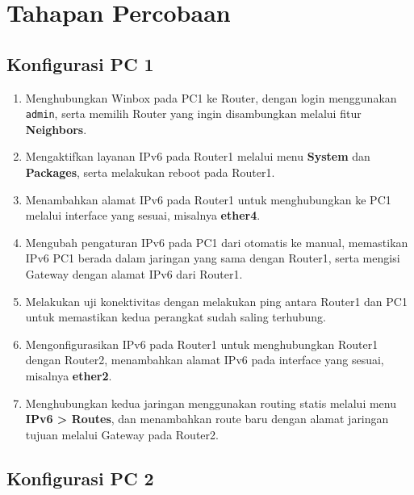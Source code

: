 \section*{Tahapan Percobaan} 

\subsection*{Konfigurasi PC 1}

\begin{enumerate}
    \item Menghubungkan Winbox pada PC1 ke Router, dengan login menggunakan \texttt{admin}, serta memilih Router yang ingin disambungkan melalui fitur \textbf{Neighbors}.
    \item Mengaktifkan layanan IPv6 pada Router1 melalui menu \textbf{System} dan \textbf{Packages}, serta melakukan reboot pada Router1.
    \item Menambahkan alamat IPv6 pada Router1 untuk menghubungkan ke PC1 melalui interface yang sesuai, misalnya \textbf{ether4}.
    \item Mengubah pengaturan IPv6 pada PC1 dari otomatis ke manual, memastikan IPv6 PC1 berada dalam jaringan yang sama dengan Router1, serta mengisi Gateway dengan alamat IPv6 dari Router1.
    \item Melakukan uji konektivitas dengan melakukan ping antara Router1 dan PC1 untuk memastikan kedua perangkat sudah saling terhubung.
    \item Mengonfigurasikan IPv6 pada Router1 untuk menghubungkan Router1 dengan Router2, menambahkan alamat IPv6 pada interface yang sesuai, misalnya \textbf{ether2}.
    \item Menghubungkan kedua jaringan menggunakan routing statis melalui menu \textbf{IPv6 > Routes}, dan menambahkan route baru dengan alamat jaringan tujuan melalui Gateway pada Router2.
\end{enumerate}

\subsection*{Konfigurasi PC 2}

